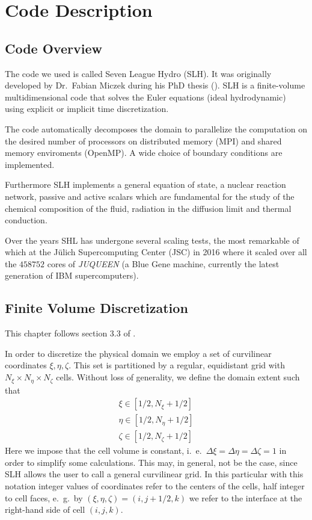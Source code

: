 \chapter{Code Description}
\section{Code Overview}
The code we used is called Seven League Hydro (SLH). It was originally developed by Dr.\ Fabian Miczek during his PhD thesis (\citet{miczek}). SLH is a finite-volume multidimensional code that solves the Euler equations (ideal hydrodynamic) using explicit or implicit time discretization.

The code automatically decomposes the domain to parallelize the computation on the desired number of processors on distributed memory (MPI) and shared memory enviroments (OpenMP). A wide choice of boundary conditions are implemented. 

Furthermore SLH implements a general equation of state, a nuclear reaction network, passive and active scalars which are fundamental for the study of the chemical composition of the fluid, radiation in the diffusion limit and thermal conduction. 

Over the years SHL has undergone several scaling tests, the most remarkable of which at the Jülich Supercomputing Center (JSC) in 2016 where it scaled over all the $458752$ cores of \textit{JUQUEEN} (a Blue Gene machine, currently the latest generation of IBM supercomputers).

\section{Finite Volume Discretization}
This chapter follows section 3.3 of \citet{miczek}.

In order to discretize the physical domain we employ a set of curvilinear coordinates $\xi, \eta, \zeta$. This set is partitioned by a regular, equidistant grid with $N_{\xi} \times N_{\eta} \times N_{\zeta}$ cells. Without loss of generality, we define the domain extent such that
\begin{equation}
\begin{split}
\xi \in [1/2, N_{\xi} + 1/2] \\
\eta \in [1/2, N_{\eta} + 1/2] \\
\zeta \in [1/2, N_{\zeta} + 1/2] 
\end{split}
\end{equation}
Here we impose that the cell volume is constant, i.\ e.\ $\Delta \xi = \Delta \eta = \Delta \zeta = 1$ in order to simplify some calculations. This may, in general, not be the case, since SLH allows the user to call a general curvilinear grid. In this particular with this notation integer values of coordinates refer to the centers of the cells, half integer to cell faces, e.\ g.\ by $(\xi, \eta, \zeta) = (i, j + 1/2, k)$ we refer to the interface at the right-hand side of cell $(i, j, k)$.

